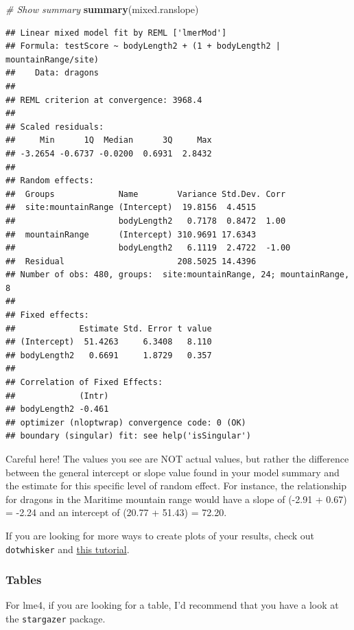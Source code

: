 \documentclass[
]{article}
\newenvironment{Shaded}{\begin{snugshade}}{\end{snugshade}}
\newcommand{\CommentTok}[1]{\textcolor[rgb]{0.56,0.35,0.01}{\textit{#1}}}
\newcommand{\FunctionTok}[1]{\textcolor[rgb]{0.13,0.29,0.53}{\textbf{#1}}}
\newcommand{\NormalTok}[1]{#1}
\begin{document}
\begin{Shaded}
\begin{Highlighting}[]
\CommentTok{\# Show summary}
\FunctionTok{summary}\NormalTok{(mixed.ranslope)}
\end{Highlighting}
\end{Shaded}

\begin{verbatim}
## Linear mixed model fit by REML ['lmerMod']
## Formula: testScore ~ bodyLength2 + (1 + bodyLength2 | mountainRange/site)
##    Data: dragons
## 
## REML criterion at convergence: 3968.4
## 
## Scaled residuals: 
##     Min      1Q  Median      3Q     Max 
## -3.2654 -0.6737 -0.0200  0.6931  2.8432 
## 
## Random effects:
##  Groups             Name        Variance Std.Dev. Corr 
##  site:mountainRange (Intercept)  19.8156  4.4515       
##                     bodyLength2   0.7178  0.8472  1.00 
##  mountainRange      (Intercept) 310.9691 17.6343       
##                     bodyLength2   6.1119  2.4722  -1.00
##  Residual                       208.5025 14.4396       
## Number of obs: 480, groups:  site:mountainRange, 24; mountainRange, 8
## 
## Fixed effects:
##             Estimate Std. Error t value
## (Intercept)  51.4263     6.3408   8.110
## bodyLength2   0.6691     1.8729   0.357
## 
## Correlation of Fixed Effects:
##             (Intr)
## bodyLength2 -0.461
## optimizer (nloptwrap) convergence code: 0 (OK)
## boundary (singular) fit: see help('isSingular')
\end{verbatim}

Careful here! The values you see are NOT actual values, but rather the
difference between the general intercept or slope value found in your
model summary and the estimate for this specific level of random effect.
For instance, the relationship for dragons in the Maritime mountain
range would have a slope of (-2.91 + 0.67) = -2.24 and an intercept of
(20.77 + 51.43) = 72.20.

If you are looking for more ways to create plots of your results, check
out \texttt{dotwhisker} and
\href{https://cran.r-project.org/web/packages/dotwhisker/vignettes/dotwhisker-vignette.html}{this
tutorial}.

\subsubsection{Tables}\label{tables}

For lme4, if you are looking for a table, I'd recommend that you have a
look at the \texttt{stargazer} package.
\end{document}
